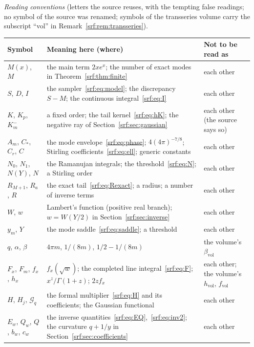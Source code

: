 \documentclass[11pt]{article}
\theoremstyle{remark}\newtheorem{remark}[theorem]{Remark}
\newcommand{\G}{\mathcal G}
\begin{document}
\medskip
\begingroup\small
\noindent\emph{Reading conventions} (letters the source reuses, with the
tempting false readings; no symbol of the source was renamed; symbols of the
transseries volume carry the subscript ``vol'' in
Remark~\ref{srf:rem:transseries}).\par\smallskip
\renewcommand{\arraystretch}{1.1}
\begin{longtable}{@{}>{\raggedright\arraybackslash}p{0.95in}>{\raggedright\arraybackslash}p{3.3in}>{\raggedright\arraybackslash}p{1.85in}@{}}
\toprule
Symbol & Meaning here (where) & Not to be read as\\
\midrule
\endhead
$M(x)$, $M$ & the main term $2xe^x$; the number of exact modes in Theorem~\ref{srf:thm:finite} & each other\\
$S$, $D$, $I$ & the sampler~\eqref{srf:eq:model}; the discrepancy $S-M$; the continuous integral~\eqref{srf:eq:I} & each other\\
$K$, $K_p$, $K_m^-$ & a fixed order; the tail kernel~\eqref{srf:eq:hK}; the negative ray of Section~\ref{srf:sec:gaussian} & each other (the source says so)\\
$A_m$, $C_*$, $C_r$, $C$ & the mode envelope~\eqref{srf:eq:phase}; $4(4\pi)^{-7/8}$; Stirling coefficients~\eqref{srf:eq:ell}; generic constants & each other\\
$N_0$, $N_1$, $N(Y)$, $N$ & the Ramanujan integrals; the threshold~\eqref{srf:eq:N}; a Stirling order & each other\\
$R_{M+1}$, $R_a$, $R$ & the exact tail~\eqref{srf:eq:Rexact}; a radius; a number of inverse terms & each other\\
$W$, $w$ & Lambert's function (positive real branch); $w=W(Y/2)$ in Section~\ref{srf:sec:inverse} & each other\\
$y_m$, $Y$ & the mode saddle~\eqref{srf:eq:saddle}; a threshold & each other\\
$q$, $\alpha$, $\beta$ & $4\pi m$, $1/(8m)$, $1/2-1/(8m)$ & the volume's $\beta_{\mathrm{vol}}$\\
$F_x$, $F_m$, $f_x$, $h_x$ & $f_x(\sqrt w)$; the completed line integral~\eqref{srf:eq:F}; $x^z/\Gamma(1+z)$; $2zf_x$ & each other; the volume's $h_{\mathrm{vol}}$, $f_{\mathrm{vol}}$\\
$H$, $H_j$, $\G_q$ & the formal multiplier~\eqref{srf:eq:H} and its coefficients; the Gaussian functional & each other\\
$E_w$, $Q_w$, $Q$, $b_w$, $c_w$ & the inverse quantities~\eqref{srf:eq:EQ},~\eqref{srf:eq:inv2}; the curvature $q+1/y$ in Section~\ref{srf:sec:coefficients} & each other\\

\end{longtable}
\end{document}
